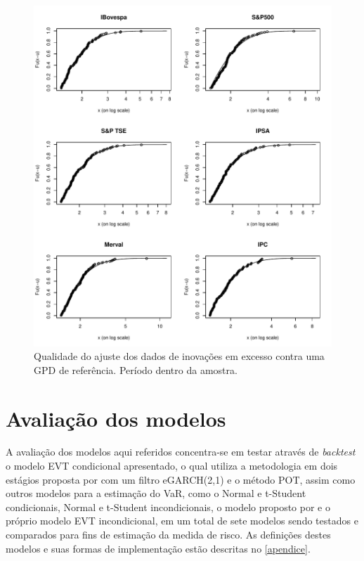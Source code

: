 \documentclass[1p]{elsarticle}
\theoremstyle{definition}
\begin{document}
\begin{figure}[H]
	\centering
	\includegraphics[width=1\linewidth]{figs/artigo-gpdfit}
	\caption{Qualidade do ajuste dos dados de inovações em excesso contra uma GPD de referência. Período dentro da amostra.}
	\label{fig:artigo-gpdfit}
\end{figure}

\section{Avaliação dos modelos}
\label{sec:avaliacao}

A avaliação dos modelos aqui referidos concentra-se em testar através de \emph{backtest} o modelo EVT condicional apresentado, o qual utiliza a metodologia em dois estágios proposta por \cite{McNeil2000} com um filtro eGARCH(2,1) e o método POT, assim como outros modelos para a estimação do VaR, como o Normal e t-Student condicionais, Normal e t-Student incondicionais, o modelo proposto por \cite{RiskMetrics1995} e o próprio modelo EVT incondicional, em um total de sete modelos sendo testados e comparados para fins de estimação da medida de risco. As definições destes modelos e suas formas de implementação estão descritas no \ref{apendice}.
\end{document}

